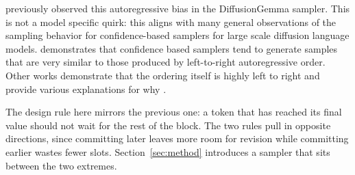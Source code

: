 \citet{asaria2026neither} previously observed this autoregressive bias in the DiffusionGemma sampler. 
This is not a model specific quirk: this aligns with many general observations of the sampling behavior for confidence-based samplers for large scale diffusion language models. 
\citet{kim2026interface} demonstrates that confidence based samplers tend to generate samples that are very similar to those produced by left-to-right autoregressive order. 
Other works demonstrate that the ordering itself is highly left to right and provide various explanations for why \citep{gong2026diffucoder, lu2026adablock, yao2026decoding}.

The design rule here mirrors the previous one: a token that has reached its final value should not wait for the rest of the block.
The two rules pull in opposite directions, since committing later leaves more room for revision while committing earlier wastes fewer slots.
Section~\ref{sec:method} introduces a sampler that sits between the two extremes.
